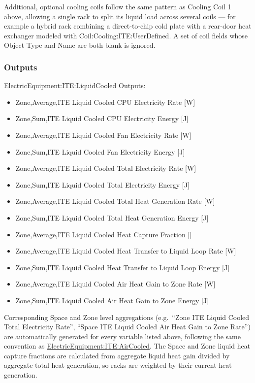 Additional, optional cooling coils follow the same pattern as Cooling Coil 1 above, allowing a single rack to split its liquid load across several coils --- for example a hybrid rack combining a direct-to-chip cold plate with a rear-door heat exchanger modeled with Coil:Cooling:ITE:UserDefined. A set of coil fields whose Object Type and Name are both blank is ignored.

\subsubsection{Outputs}\label{outputs-iteliquidcooled}

ElectricEquipment:ITE:LiquidCooled Outputs:

\begin{itemize}
\tightlist
\item
  Zone,Average,ITE Liquid Cooled CPU Electricity Rate {[}W{]}
\item
  Zone,Sum,ITE Liquid Cooled CPU Electricity Energy {[}J{]}
\item
  Zone,Average,ITE Liquid Cooled Fan Electricity Rate {[}W{]}
\item
  Zone,Sum,ITE Liquid Cooled Fan Electricity Energy {[}J{]}
\item
  Zone,Average,ITE Liquid Cooled Total Electricity Rate {[}W{]}
\item
  Zone,Sum,ITE Liquid Cooled Total Electricity Energy {[}J{]}
\item
  Zone,Average,ITE Liquid Cooled Total Heat Generation Rate {[}W{]}
\item
  Zone,Sum,ITE Liquid Cooled Total Heat Generation Energy {[}J{]}
\item
  Zone,Average,ITE Liquid Cooled Heat Capture Fraction {[]}
\item
  Zone,Average,ITE Liquid Cooled Heat Transfer to Liquid Loop Rate {[}W{]}
\item
  Zone,Sum,ITE Liquid Cooled Heat Transfer to Liquid Loop Energy {[}J{]}
\item
  Zone,Average,ITE Liquid Cooled Air Heat Gain to Zone Rate {[}W{]}
\item
  Zone,Sum,ITE Liquid Cooled Air Heat Gain to Zone Energy {[}J{]}
\end{itemize}

Corresponding Space and Zone level aggregations (e.g.\ ``Zone ITE Liquid Cooled Total Electricity Rate'', ``Space ITE Liquid Cooled Air Heat Gain to Zone Rate'') are automatically generated for every variable listed above, following the same convention as \hyperref[electricequipmentiteaircooled]{ElectricEquipment:ITE:AirCooled}. The Space and Zone liquid heat capture fractions are calculated from aggregate liquid heat gain divided by aggregate total heat generation, so racks are weighted by their current heat generation.

